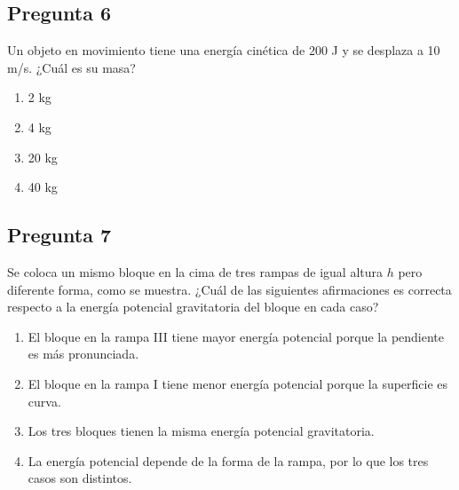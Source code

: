 \begin{preguntabox}
\subsection{Pregunta 6}
Un objeto en movimiento tiene una energía cinética de 200 J y se desplaza a 10 m/s. ¿Cuál es su masa?

\begin{enumerate}
    \item[A)] 2 kg
    \item[B)] 4 kg
    \item[C)] 20 kg
    \item[D)] 40 kg
\end{enumerate}
\end{preguntabox}
\newpage
\begin{preguntabox}
\subsection{Pregunta 7}
Se coloca un mismo bloque en la cima de tres rampas de igual altura $h$ pero diferente forma, como se muestra. ¿Cuál de las siguientes afirmaciones es correcta respecto a la energía potencial gravitatoria del bloque en cada caso?

\begin{center}
\shorthandoff{>}\shorthandoff{<}
\shorthandon{>}\shorthandon{<}
\end{center}

\begin{enumerate}
    \item[A)] El bloque en la rampa III tiene mayor energía potencial porque la pendiente es más pronunciada.
    \item[B)] El bloque en la rampa I tiene menor energía potencial porque la superficie es curva.
    \item[C)] Los tres bloques tienen la misma energía potencial gravitatoria.
    \item[D)] La energía potencial depende de la forma de la rampa, por lo que los tres casos son distintos.
\end{enumerate}
\end{preguntabox}

